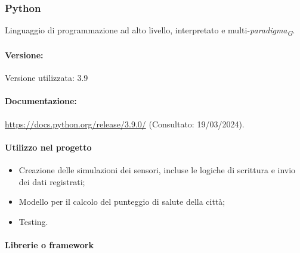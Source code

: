 \subsubsection{Python}
Linguaggio di programmazione ad alto livello, interpretato e multi-\textit{paradigma}\textsubscript{\textit{G}}.

\paragraph{Versione:}
Versione utilizzata: 3.9
\paragraph{Documentazione:}
\url{https://docs.python.org/release/3.9.0/} (Consultato: 19/03/2024).

\paragraph{Utilizzo nel progetto} 
\begin{itemize}
    \item Creazione delle simulazioni dei sensori, incluse le logiche di scrittura e invio dei dati registrati;
    \item Modello per il calcolo del punteggio di salute della città;
    \item Testing.
\end{itemize}

\paragraph{Librerie o framework}

